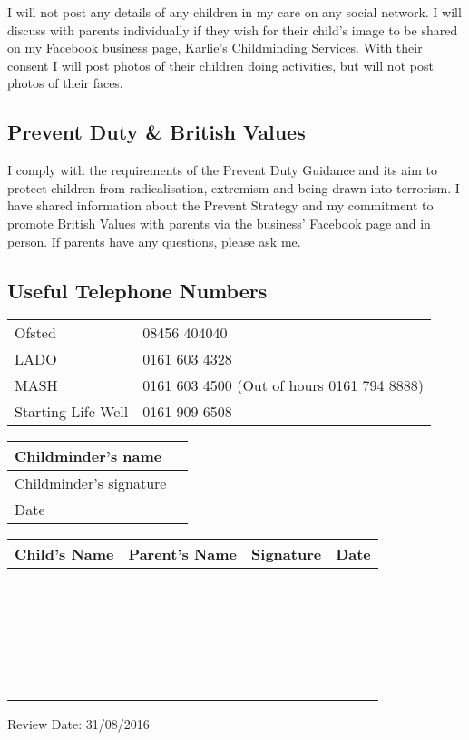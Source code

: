 I will not post any details of any children in my care on any
social network. I will discuss with parents individually if they wish 
for their child's image to be shared on my Facebook business page, Karlie's 
Childminding Services. With their consent I will post photos of their children
doing activities, but will not post photos of their faces. 

\subsection{Prevent Duty \& British Values}

I comply with the requirements of the Prevent Duty Guidance and its aim to
protect children from radicalisation, extremism and being drawn into terrorism.
I have shared information about the Prevent Strategy and my commitment to 
promote British Values with parents via the business' Facebook page and in person. 
If parents have any questions, please ask me.

\subsection{Useful Telephone Numbers}

\begin{table}[h]
  \begin{tabularx}{\textwidth}{lX}
    Ofsted & 08456 404040 \\
    LADO & 0161 603 4328 \\
    MASH & 0161 603 4500 (Out of hours 0161 794 8888) \\
    Starting Life Well & 0161 909 6508 \\ 
 \end{tabularx}
\end{table}

\begin{table}[h]
  \def\arraystretch{2.0}
  \begin{tabularx}{\textwidth}{|l|X|}
    \hline
    Childminder's name & \\
    \hline
    Childminder's signature &  \\
    \hline
    Date & \\
    \hline
  \end{tabularx}
\end{table}

\begin{table}[H]
  \def\arraystretch{2.0}
  \begin{tabularx}{\textwidth}{|X|X|X|X|}
    \hline
    Child's Name & Parent's Name & Signature & Date \\
    \hline
    ~ & ~ & ~ & \\
    \hline
    ~ & ~ & ~ & \\
    \hline
    ~ & ~ & ~ & \\
    \hline
    ~ & ~ & ~ & \\
    \hline
    ~ & ~ & ~ & \\
    \hline
  \end{tabularx}
\end{table}

Review Date: 31/08/2016


